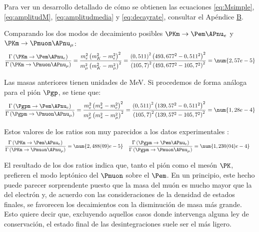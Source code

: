 Para ver un desarrollo detallado de cómo se obtienen las ecuaciones \ref{eq:Msimple}, \ref{eq:amplitudM}, \ref{eq:amplitudmedia} y \ref{eq:decayrate}, consultar el Apéndice \hyperref[cap:B]{B}.

Comparando los dos modos de decaimiento posibles $\PKm \rightarrow \Pem \APnu_{e}$ y $\PKm \rightarrow \Pmuon \APnu_{\mu}$:
\begin{equation}
\dfrac{\Gamma \left( \PKm \rightarrow \Pem \APnu_{e}\right) }{\Gamma \left( \PKm \rightarrow \Pmuon \APnu_{\mu}\right) }=\dfrac{m_{e}^{2}\left( m_{K}^{2}-m_{e}^{2}\right) ^{2}}{m_{\mu }^{2}\left( m_{K}^{2}-m_{\mu }^{2}\right) ^{2}}=\dfrac{\left( 0,511\right) ^{2}\left( 493,677^{2}-0,511^{2}\right) ^{2}}{\left( 105,7\right) ^{2}\left( 493,677^{2}-105,7^{2}\right) ^{2}}=\num{2,57e-5}\label{eq:BRkaon}
\end{equation}

Las masas anteriores tienen unidades de MeV. Si procedemos de forma análoga para el pión $\Pgp$, se tiene que:
\begin{equation}
\dfrac{\Gamma \left( \Pgpm \rightarrow \Pem \APnu_{e}\right) }{\Gamma \left( \Pgpm \rightarrow \Pmuon \APnu_{\mu}\right) }=\dfrac{m_{e}^{2}\left( m_{\pi}^{2}-m_{e}^{2}\right) ^{2}}{m_{\mu }^{2}\left( m_{\pi}^{2}-m_{\mu }^{2}\right) ^{2}}=\dfrac{\left( 0,511\right) ^{2}\left(139,57^{2}-0,511^{2}\right) ^{2}}{\left( 105,7\right) ^{2}\left( 139,57^{2}-105,7^{2}\right) ^{2}}=\num{1,28e-4}\label{eq:BRpion}
\end{equation}

Estos valores de los ratios son muy parecidos a los datos experimentales \cite{tanabashi} \cite{olive}:
\begin{align}
\dfrac{\Gamma \left( \PKm \rightarrow \Pem \APnu_{e}\right)}{\Gamma \left( \PKm \rightarrow \Pmuon \APnu_{\mu}\right)} &= \num{2,488(09)e-5} & \dfrac{\Gamma \left( \Pgpm \rightarrow \Pem \APnu_{e}\right)}{\Gamma \left( \Pgpm \rightarrow \Pmuon \APnu_{\mu}\right)} &= \num{1,230(04)e-4}\label{eq:BRexp}
\end{align}

El resultado de los dos ratios indica que, tanto el pión como el mesón $\PK$, prefieren el modo leptónico del $\Pmuon$ sobre el $\Pem$. En un principio, este hecho puede parecer sorprendente puesto que la masa del muón es mucho mayor que la del electrón y, de acuerdo con las consideraciones de la densidad de estados finales, se favorecen los decaimientos con la disminución de masa más grande. Esto quiere decir que, excluyendo aquellos casos donde intervenga alguna ley de conservación, el estado final de las desintegraciones suele ser el más ligero. 

